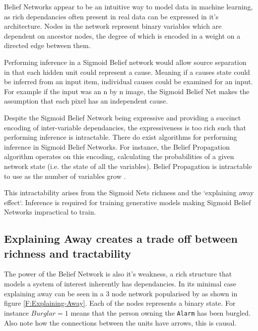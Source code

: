     Belief Networks appear to be an intuitive way to model data in machine learning, as rich dependancies often present in real data can be expressed in it's architecture. Nodes in the network represent binary variables which are dependent on ancestor nodes, the degree of which is encoded in a weight on a directed edge between them.

    Performing inference in a Sigmoid Belief network would allow source separation in that each hidden unit could represent a cause. Meaning if a causes state could be inferred from an input item, individual causes could be examined for an input. For example if the input was an n by n image, the Sigmoid Belief Net makes the assumption that each pixel has an independent cause.

    Despite the Sigmoid Belief Network being expressive and providing a succinct encoding of inter-variable dependancies, the expressiveness is too rich such that performing inference is intractable. There do exist algorithms for performing inference in Sigmoid Belief Networks. For instance, the Belief Propagation algorithm  operates on this encoding, calculating the probabilities of a given network state (i.e. the state of all the variables).  Belief Propagation is intractable to use as the number of variables grow .

    This intractability arises from the Sigmoid Nets richness and the `explaining away effect`. Inference is required for training generative models making Sigmoid Belief Networks impractical to train. 

    \subsection{Explaining Away creates a trade off between richness and tractability}\label{SS:Explaining-Away}
    \todo%
    The power of the Belief Network is also it's weakness, a rich structure that models a system of interest inherently has dependancies. In its minimal case explaining away can be seen in a 3 node network popularised by  as shown in figure \ref{F:Explaining-Away}. Each of the nodes represents a binary state. For instance $Burglar = 1$ means that the person owning the \texttt{Alarm} has been burgled. Also note how the connections between the units have arrows, this is causal.

